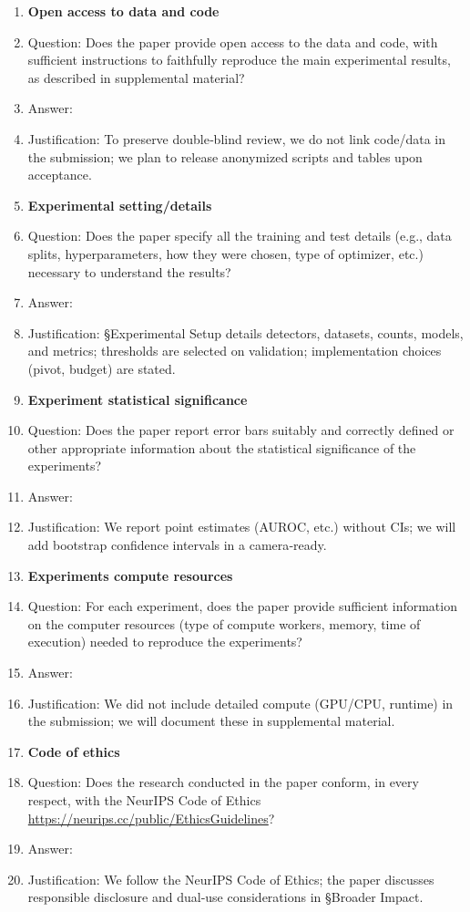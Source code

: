 \documentclass{article}
\begin{document}
\begin{enumerate}
\item {\bf Open access to data and code}
    \item[] Question: Does the paper provide open access to the data and code, with sufficient instructions to faithfully reproduce the main experimental results, as described in supplemental material?
    \item[] Answer: \answerNo{}
    \item[] Justification: To preserve double‑blind review, we do not link code/data in the submission; we plan to release anonymized scripts and tables upon acceptance.


\item {\bf Experimental setting/details}
    \item[] Question: Does the paper specify all the training and test details (e.g., data splits, hyperparameters, how they were chosen, type of optimizer, etc.) necessary to understand the results?
    \item[] Answer: \answerYes{}
    \item[] Justification: §Experimental Setup details detectors, datasets, counts, models, and metrics; thresholds are selected on validation; implementation choices (pivot, budget) are stated.

\item {\bf Experiment statistical significance}
    \item[] Question: Does the paper report error bars suitably and correctly defined or other appropriate information about the statistical significance of the experiments?
    \item[] Answer: \answerNo{}
    \item[] Justification: We report point estimates (AUROC, etc.) without CIs; we will add bootstrap confidence intervals in a camera‑ready.

\item {\bf Experiments compute resources}
    \item[] Question: For each experiment, does the paper provide sufficient information on the computer resources (type of compute workers, memory, time of execution) needed to reproduce the experiments?
    \item[] Answer: \answerNo{}
    \item[] Justification: We did not include detailed compute (GPU/CPU, runtime) in the submission; we will document these in supplemental material.
\item {\bf Code of ethics}
    \item[] Question: Does the research conducted in the paper conform, in every respect, with the NeurIPS Code of Ethics \url{https://neurips.cc/public/EthicsGuidelines}?
    \item[] Answer: \answerYes{}
    \item[] Justification: We follow the NeurIPS Code of Ethics; the paper discusses responsible disclosure and dual‑use considerations in §Broader Impact.



\end{enumerate}
\end{document}
